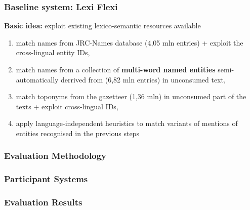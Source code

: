 \documentclass{beamer}
\begin{document}
\begin{frame}[fragile]
 \frametitle{Baseline system: Lexi Flexi}

\textbf{Basic idea:} exploit existing lexico-semantic resources available

\begin{enumerate}

\item match names from {\color{red}JRC-Names} database (4,05 mln entries) + exploit the cross-lingual entity IDs,

\vspace{0.2cm}

\item match names from a collection of \textbf{multi-word named entities} semi-automatically derrived from {\color{red}{\sc Babelnet}} (6,82 mln entries) in unconsumed text,

\vspace{0.2cm}

\item match toponyms from the {\color{red}{\sc GeoNames}} gazetteer (1,36 mln) in unconsumed part of the texts + exploit cross-lingual IDs,

\vspace{0.2cm}

\item apply language-independent heuristics to match variants of mentions of entities recognised in the previous steps

\end{enumerate}

\end{frame}\xi

\begin{frame}
 \frametitle{Evaluation Methodology}

\end{frame}


\begin{frame}
 \frametitle{Participant Systems}

\end{frame}

\begin{frame}
 \frametitle{Evaluation Results}

\end{frame}
\end{document}
